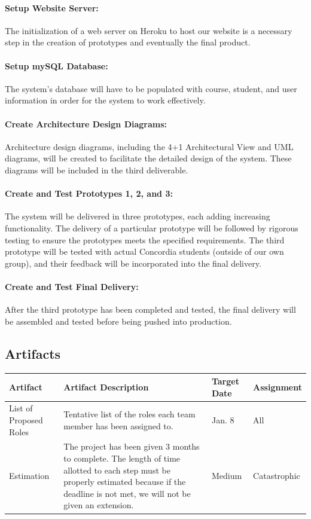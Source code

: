 \documentclass[12pt]{article}
\begin{document}
\paragraph*{Setup Website Server:}The initialization of a web server on Heroku to host our website is a necessary step in the creation of prototypes and eventually the final product.

\paragraph*{Setup mySQL Database:}The system's database will have to be populated with course, student, and user information in order for the system to work effectively.

\paragraph*{Create Architecture Design Diagrams:}Architecture design diagrams, including the 4+1 Architectural View and UML diagrams, will be created to facilitate the detailed design of the system. These diagrams will be included in the third deliverable.

\paragraph*{Create and Test Prototypes 1, 2, and 3:}The system will be delivered in three prototypes, each adding increasing functionality. The delivery of a particular prototype will be followed by rigorous testing to ensure the prototypes meets the specified requirements. The third prototype will be tested with actual Concordia students (outside of our own group), and their feedback will be incorporated into the final delivery.

\paragraph*{Create and Test Final Delivery:}After the third prototype has been completed and tested, the final delivery will be assembled and tested before being pushed into production.

\subsection{Artifacts}
\begin{center}
\begin{longtable}{| p{4cm} | p{7cm} | p{2cm} | p{2cm} |}
\hline
\textbf{Artifact}	&  \centering \textbf{Artifact Description} & \textbf{Target Date} & \textbf{Assignment} \\ \hline \hline
List of Proposed Roles          & Tentative list of the roles each team member has been assigned to.   & \color{green}Jan. 8 & All   \\ \hline
Estimation  & The project has been given 3 months to complete. The length of time allotted to each step must be properly estimated because if the deadline is not met, we will not be given an extension. & Medium & Catastrophic \\ \hline
\end{longtable}
\end{center}
\end{document}
